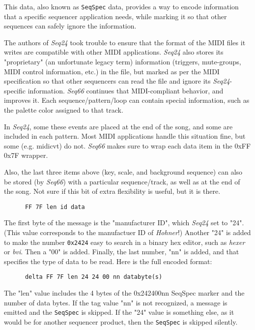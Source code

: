    This data, also known as
   \texttt{SeqSpec} data, provides a way to encode information
   that a specific sequencer application needs, while marking it so that other
   sequences can safely ignore the information.

   The authors of \textsl{Seq24} took trouble to ensure that the format
   of the MIDI files it writes are compatible with other MIDI applications.
   \textsl{Seq24} also stores its "proprietary" (an unfortunate legacy term)
   information (triggers, mute-groups, MIDI control
   information, etc.) in the file, but marked as per the MIDI specification
   so that other sequencers can read
   the file and ignore its \textsl{Seq24}-specific information.
   \textsl{Seq66} continues that MIDI-compliant behavior, and improves it.
   Each sequence/pattern/loop can contain special information, such as the
   palette color assigned to that track.

   In \textsl{Seq24}, some these events are placed at the end of the song,
   and some are included in each pattern.
   Most MIDI applications handle this situation
   fine, but some (e.g. midicvt) do not.  \textsl{Seq66} makes
   sure to wrap each data item in the 0xFF 0x7F wrapper.

   Also, the last three items above (key, scale, and background sequence) can
   also be stored (by \textsl{Seq66}) with a particular sequence/track,
   as well as at the end of the song.  Not sure if this bit of extra
   flexibility is useful, but it is there.

   \begin{verbatim}
      FF 7F len id data
   \end{verbatim}

   The first byte of the message is the "manufacturer ID",
   which \textsl{Seq24} set to "24".
   (This value corresponds to the manufactuer ID of \textsl{Hohner}!)
   Another "24" is added to make the number \texttt{0x2424}
   easy to search in a binary hex editor, such as \textsl{hexer} or
   \textsl{bvi}.
   Then a "00" is added.  Finally, the last number, "nn" is added, and that
   specifies the type of data to be read.  Here is the full encoded
   format:

   \begin{verbatim}
      delta FF 7F len 24 24 00 nn databyte(s)
   \end{verbatim}

   The "len" value includes the 4 bytes of the 0x242400nn
   SeqSpec marker and the number of data bytes.
   If the tag value "nn" is not recognized, a message is emitted and the
   \texttt{SeqSpec} is skipped.  If the "24" value is something else, as it
   would be for another sequencer product, then the
   \texttt{SeqSpec} is skipped silently.

